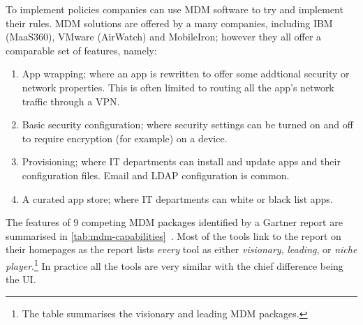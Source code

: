 \documentclass[thesis.tex]{subfiles}
\begin{document}
To implement policies companies can use \ac{MDM} software to try and implement
their rules.  \ac{MDM} solutions are offered by a many companies, including IBM
(MaaS360), VMware (AirWatch) and MobileIron; however they all offer a
comparable set of features, namely:
\begin{enumerate}
\item App wrapping; where an app is rewritten to offer some addtional security
  or network properties. This is often limited to routing all the app's
  network traffic through a VPN.
\item Basic security configuration; where security settings can be turned on and
  off to require encryption (for example) on a device.
\item Provisioning; where IT departments can install and update apps and
  their configuration files. Email and LDAP configuration is common.
\item A curated app store; where IT departments can white or black list apps.
\end{enumerate}

The features of 9 competing MDM packages identified by a Gartner report are
summarised in \autoref{tab:mdm-capabilities}~\cite{rob_smith_magic_2016}.  Most
of the tools link to the report on their homepages as the report lists \emph{every} tool as
either \emph{visionary}, \emph{leading}, or \emph{niche player}.\footnote{The
  table summarises the visionary and leading MDM packages.}  In practice all the
tools are very similar with the chief difference being the UI.
\end{document}

